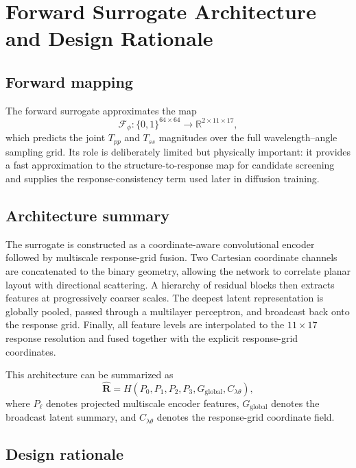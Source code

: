 \documentclass[10pt,a4paper]{article}
\newcommand{\tp}{T_{pp}}
\newcommand{\ts}{T_{ss}}
\newcommand{\Rpred}{\widehat{\mathbf{R}}}
\begin{document}
\section{Forward Surrogate Architecture and Design Rationale}

\subsection{Forward mapping}

The forward surrogate approximates the map
\begin{equation}
\mathcal{F}_{\phi}: \{0,1\}^{64\times64}\rightarrow \mathbb{R}^{2\times11\times17},
\end{equation}
which predicts the joint $\tp$ and $\ts$ magnitudes over the full wavelength--angle sampling grid. Its role is deliberately limited but physically important: it provides a fast approximation to the structure-to-response map for candidate screening and supplies the response-consistency term used later in diffusion training.

\subsection{Architecture summary}

The surrogate is constructed as a coordinate-aware convolutional encoder followed by multiscale response-grid fusion. Two Cartesian coordinate channels are concatenated to the binary geometry, allowing the network to correlate planar layout with directional scattering. A hierarchy of residual blocks then extracts features at progressively coarser scales. The deepest latent representation is globally pooled, passed through a multilayer perceptron, and broadcast back onto the response grid. Finally, all feature levels are interpolated to the $11\times17$ response resolution and fused together with the explicit response-grid coordinates.

This architecture can be summarized as
\begin{equation}
\Rpred = H\!\left(P_0,P_1,P_2,P_3,G_{\mathrm{global}},C_{\lambda\theta}\right),
\end{equation}
where $P_\ell$ denotes projected multiscale encoder features, $G_{\mathrm{global}}$ denotes the broadcast latent summary, and $C_{\lambda\theta}$ denotes the response-grid coordinate field.

\subsection{Design rationale}
\end{document}
